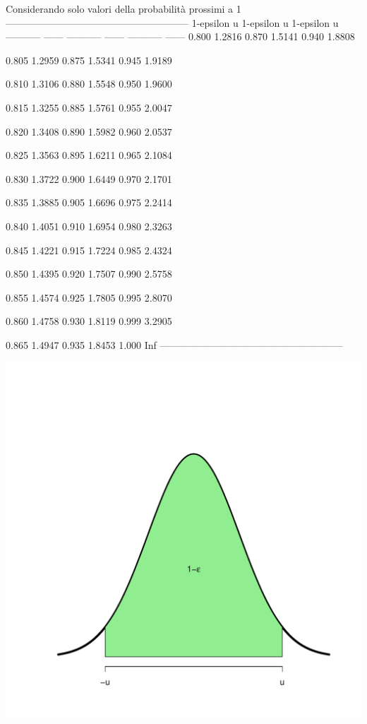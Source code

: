 \documentclass[onecolumn,12pt]{book}\usepackage[]{graphicx}\usepackage[]{color}
\makeatletter
\def\maxwidth{ %
  \ifdim\Gin@nat@width>\linewidth
    \linewidth
  \else
    \Gin@nat@width
  \fi
}
\newenvironment{knitrout}{}{} %
\makeatother
\begin{document}
Considerando solo valori della probabilità  prossimi a 1
\begin{knitrout}
\color{fgcolor}
--------------------------------------------------------
 1-epsilon    u     1-epsilon    u     1-epsilon    u   
----------- ------ ----------- ------ ----------- ------
   0.800    1.2816    0.870    1.5141    0.940    1.8808

   0.805    1.2959    0.875    1.5341    0.945    1.9189

   0.810    1.3106    0.880    1.5548    0.950    1.9600

   0.815    1.3255    0.885    1.5761    0.955    2.0047

   0.820    1.3408    0.890    1.5982    0.960    2.0537

   0.825    1.3563    0.895    1.6211    0.965    2.1084

   0.830    1.3722    0.900    1.6449    0.970    2.1701

   0.835    1.3885    0.905    1.6696    0.975    2.2414

   0.840    1.4051    0.910    1.6954    0.980    2.3263

   0.845    1.4221    0.915    1.7224    0.985    2.4324

   0.850    1.4395    0.920    1.7507    0.990    2.5758

   0.855    1.4574    0.925    1.7805    0.995    2.8070

   0.860    1.4758    0.930    1.8119    0.999    3.2905

   0.865    1.4947    0.935    1.8453    1.000     Inf  
--------------------------------------------------------


\includegraphics[width=\maxwidth]{figure/unnamed-chunk-33-1} 

\end{knitrout}
\end{document}

